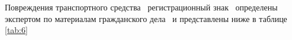 %

Повреждения транспортного средства  \, регистрационный знак \, определены экспертом по материалам гражданского дела \delonum\, и представлены ниже в таблице \ref{tab:6}


